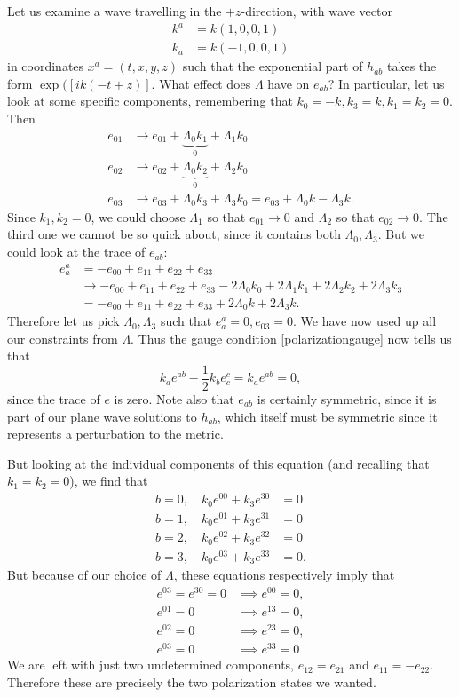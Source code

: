 Let us examine a wave travelling in the $+z$-direction, with wave vector
\begin{align*}
    k^a&= k(1,0,0,1)\\
    k_a&=k(-1,0,0,1)
\end{align*}
in coordinates $x^a=(t,x,y,z)$ such that the exponential part of $h_{ab}$ takes the form $\exp([ik(-t+z)].$ What effect does $\Lambda$ have on $e_{ab}$? In particular, let us look at some specific components, remembering that $k_0=-k, k_3=k,k_1=k_2=0$. Then
\begin{align*}
    e_{01}&\to e_{01}+\underbrace{\Lambda_0 k_1}_0 +\Lambda_1 k_0\\
    e_{02}&\to e_{02}+\underbrace{\Lambda_0 k_2}_0+\Lambda_2 k_0\\
    e_{03}&\to e_{03}+\Lambda_0 k_3 +\Lambda_3 k_0=e_{03}+\Lambda_0 k -\Lambda_3 k.
\end{align*}
Since $k_1,k_2=0$, we could choose $\Lambda_1$ so that $e_{01}\to 0$ and $\Lambda_2$ so that $e_{02}\to 0$. The third one we cannot be so quick about, since it contains both $\Lambda_0,\Lambda_3$. But we could look at the trace of $e_{ab}$:
\begin{align}
    e^a_a &= -e_{00}+e_{11}+e_{22}+e_{33}\\
    &\to -e_{00}+e_{11}+e_{22}+e_{33} -2\Lambda_0k_0 +2\Lambda_1 k_1 +2\Lambda_2 k_2 +2\Lambda_3k_3\\
    &= -e_{00}+e_{11}+e_{22}+e_{33} + 2\Lambda_0k + 2\Lambda_3 k.
\end{align}
Therefore let us pick $\Lambda_0,\Lambda_3$ such that $e^a_a=0, e_{03}=0.$ We have now used up all our constraints from $\Lambda$. Thus the gauge condition \ref{polarizationgauge} now tells us that
$$k_a e^{ab}-\frac{1}{2}k_b e^c_c = k_a e^{ab}=0,$$
since the trace of $e$ is zero. Note also that $e_{ab}$ is certainly symmetric, since it is part of our plane wave solutions to $h_{ab}$, which itself must be symmetric since it represents a perturbation to the metric.

But looking at the individual components of this equation (and recalling that $k_1=k_2=0$), we find that
\begin{align*}
    b=0,\quad k_0 e^{00}+k_3 e^{30}&=0\\
    b=1,\quad k_0 e^{01}+k_3 e^{31}&=0\\
    b=2,\quad k_0 e^{02}+k_3 e^{32}&=0\\
    b=3,\quad k_0 e^{03}+k_3 e^{33}&=0.
\end{align*}
But because of our choice of $\Lambda$, these equations respectively imply that
\begin{align*}
e^{03}=e^{30}=0&\implies e^{00}=0,\\
e^{01}=0 &\implies e^{13}=0,\\
e^{02}=0 &\implies e^{23}=0,\\
e^{03}=0 &\implies e^{33}=0
\end{align*}
We are left with just two undetermined components, $e_{12}=e_{21}$ and $e_{11}=-e_{22}.$ Therefore these are precisely the two polarization states we wanted.

